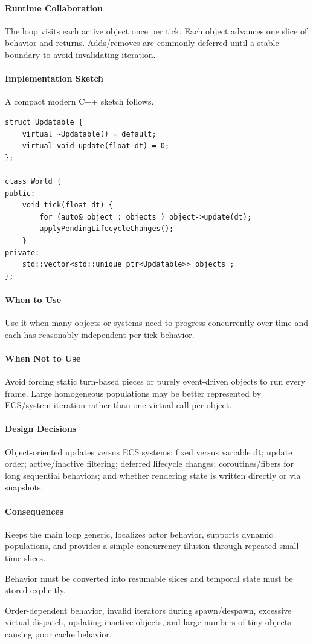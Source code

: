 \documentclass[11pt]{article}
\begin{document}
\paragraph{Runtime Collaboration} The loop visits each active object once per tick. Each object advances one slice of behavior and returns. Adds/removes are commonly deferred until a stable boundary to avoid invalidating iteration.
\paragraph{Implementation Sketch} A compact modern C++ sketch follows.
\begin{lstlisting}
struct Updatable {
    virtual ~Updatable() = default;
    virtual void update(float dt) = 0;
};

class World {
public:
    void tick(float dt) {
        for (auto& object : objects_) object->update(dt);
        applyPendingLifecycleChanges();
    }
private:
    std::vector<std::unique_ptr<Updatable>> objects_;
};
\end{lstlisting}
\paragraph{When to Use} Use it when many objects or systems need to progress concurrently over time and each has reasonably independent per-tick behavior.
\paragraph{When Not to Use} Avoid forcing static turn-based pieces or purely event-driven objects to run every frame. Large homogeneous populations may be better represented by ECS/system iteration rather than one virtual call per object.
\paragraph{Design Decisions} Object-oriented updates versus ECS systems; fixed versus variable dt; update order; active/inactive filtering; deferred lifecycle changes; coroutines/fibers for long sequential behaviors; and whether rendering state is written directly or via snapshots.
\paragraph{Consequences}
\begin{description}[leftmargin=2.7cm,style=nextline]
\item[Benefits] Keeps the main loop generic, localizes actor behavior, supports dynamic populations, and provides a simple concurrency illusion through repeated small time slices.
\item[Costs] Behavior must be converted into resumable slices and temporal state must be stored explicitly.
\item[Risks] Order-dependent behavior, invalid iterators during spawn/despawn, excessive virtual dispatch, updating inactive objects, and large numbers of tiny objects causing poor cache behavior.
\end{description}
\end{document}
